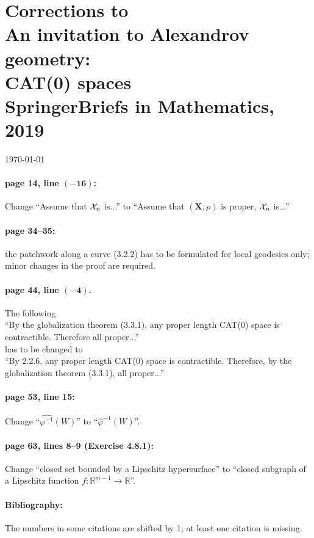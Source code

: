 \documentclass[twoside]{article}
\begin{document}
\pagestyle{empty}
\section*{Corrections to\\
An invitation to Alexandrov geometry:\\ CAT(0) spaces\\
{\normalsize  SpringerBriefs in Mathematics, 2019}
}

\today

\bigskip

\paragraph{page 14, line $\bm{(-16)}$:} Change ``Assume that $\mathcal{X}_n$ is...'' to ``Assume that $(\bm{X},\rho)$ is proper, $\mathcal{X}_n$ is...''

\paragraph{page 34--35:} the patchwork along a curve (3.2.2) has to be formulated for local geodesics only; minor changes in the proof are required.

\paragraph{page 44, line $\bm{(-4)}$.} The following\\
``By the globalization theorem (3.3.1), any proper length CAT(0) space is contractible. Therefore all proper...''\\
has to be changed to\\
``By 2.2.6, any proper length CAT(0) space is contractible. Therefore, by the globalization theorem (3.3.1), all proper...''

\paragraph{page 53, line 15:} Change ``\(\hat{\varphi^{-1}}(W)\)'' to ``\(\hat\varphi^{-1}(W)\)''.

\paragraph{page 63, lines 8--9 (Exercise 4.8.1):}  Change ``closed set bounded by a Lipschitz hypersurface'' to ``closed subgraph of a Lipschitz function \(f\colon \mathbb{R}^{m-1}\to\mathbb{R}\)''.

\paragraph{Bibliography:}
The numbers in some citations are shifted by 1; at least one citation is missing.
\end{document}
